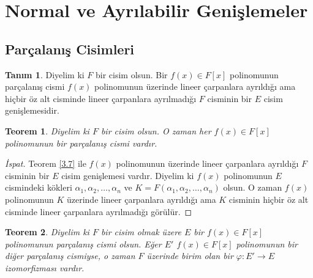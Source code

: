 \documentclass{article}
\newtheorem{thm}{Teorem}[section]
\theoremstyle{definition}
\newtheorem{defn}{Tanım}[section]
\theoremstyle{remark}
\begin{document}
	\section{Normal ve Ayrılabilir Genişlemeler}
	
    	\subsection{Parçalanış Cisimleri}
    	
        	\begin{defn}
    	        Diyelim ki $F$ bir cisim olsun. Bir $f(x) \in F[x]$ polinomunun parçalanış cismi $f(x)$ polinomunun üzerinde lineer çarpanlara ayrıldığı ama hiçbir öz alt cisminde lineer çarpanlara ayrılmadığı $F$ cisminin bir $E$ cisim genişlemesidir.
    	    \end{defn}
    	    
    	    \begin{thm}
    	        Diyelim ki $F$ bir cisim olsun. O zaman her $f(x) \in F[x]$ polinomunun bir parçalanış cismi vardır.
    	    \end{thm}
    	    
    	    \begin{proof}[İspat]
    	        Teorem \ref{3.7} ile $f(x)$ polinomunun üzerinde lineer çarpanlara ayrıldığı $F$ cisminin bir $E$ cisim genişlemesi vardır. Diyelim ki $f(x)$ polinomunun $E$ cismindeki kökleri $\alpha_1, \alpha_2, \dots, \alpha_n$ ve $K = F(\alpha_1, \alpha_2, \dots, \alpha_n)$ olsun. O zaman $f(x)$ polinomunun $K$ üzerinde lineer çarpanlara ayrıldığı ama $K$ cisminin hiçbir öz alt cisminde lineer çarpanlara ayrılmadığı görülür.
    	    \end{proof}
    	    
    	    \begin{thm}
    	        Diyelim ki $F$ bir cisim olmak üzere $E$ bir $f(x) \in F[x]$ polinomunun parçalanış cismi olsun. Eğer $E'$ $f(x) \in F[x]$ polinomunun bir diğer parçalanış cismiyse, o zaman $F$ üzerinde birim olan bir $\varphi: E' \to E$ izomorfizması vardır.
    		\end{thm}
    		
\end{document}
